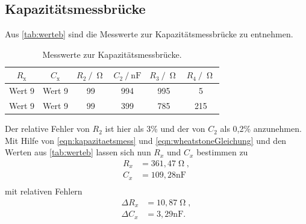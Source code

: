 \subsection{Kapazitätsmessbrücke}
Aus \autoref{tab:werteb} sind die Messwerte zur Kapazitätsmessbrücke zu entnehmen.
\begin{table}[H]
  \centering
  \caption{Messwerte zur Kapazitätsmessbrücke.}
  \label{tab:werteb} 
  \begin{tabular}{c c c c c c}
    \toprule
    $R_{\text{x}}$ & $C_{\text{x}}$ & $R_{\text{2}} \:/\: \upOmega$ & $C_{\text{2}} \:/\: \si{\nano\farad}$ & $R_{\text{3}} \:/\: \upOmega$ & $R_{\text{4}} \:/\: \upOmega$ \\
    \midrule
    Wert 9 & Wert 9 & 99 & 994 & 995 & 5 \\
    Wert 9 & Wert 9 & 99 & 399 & 785 & 215 \\
    \bottomrule
  \end{tabular}
\end{table}
Der relative Fehler von $R_2$ ist hier als 3\% und der von $C_2$ als 0,2\% anzunehmen. Mit Hilfe von \autoref{eqn:kapazitaetsmess} und \autoref{eqn:wheatstoneGleichung} und den
Werten aus \autoref{tab:werteb} lassen sich nun $R_x$ und $C_x$ bestimmen zu
\begin{align*}
  R_x &= 361,47 \upOmega, \\
  C_x &= 109,28 \si{\nano\farad} \\
\end{align*}
mit relativen Fehlern
\begin{align*}
  \Delta R_x &= 10,87 \upOmega, \\
  \Delta C_x &= 3,29 \si{\nano\farad} . \\
\end{align*}



